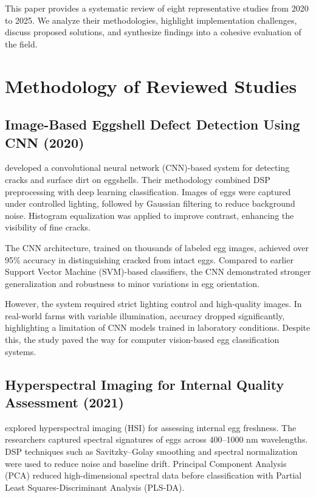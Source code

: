 \documentclass[conference]{IEEEtran}
\begin{document}
	This paper provides a systematic review of eight representative studies from 2020 to 2025. We analyze their methodologies, highlight implementation challenges, discuss proposed solutions, and synthesize findings into a cohesive evaluation of the field.
	
	\section{Methodology of Reviewed Studies}
	
	\subsection{Image-Based Eggshell Defect Detection Using CNN (2020)}
	\cite{zhang2020cnn} developed a convolutional neural network (CNN)-based system for detecting cracks and surface dirt on eggshells. Their methodology combined DSP preprocessing with deep learning classification. Images of eggs were captured under controlled lighting, followed by Gaussian filtering to reduce background noise. Histogram equalization was applied to improve contrast, enhancing the visibility of fine cracks.  
	
	The CNN architecture, trained on thousands of labeled egg images, achieved over 95\% accuracy in distinguishing cracked from intact eggs. Compared to earlier Support Vector Machine (SVM)-based classifiers, the CNN demonstrated stronger generalization and robustness to minor variations in egg orientation.  
	
	However, the system required strict lighting control and high-quality images. In real-world farms with variable illumination, accuracy dropped significantly, highlighting a limitation of CNN models trained in laboratory conditions. Despite this, the study paved the way for computer vision-based egg classification systems.
	
	\subsection{Hyperspectral Imaging for Internal Quality Assessment (2021)}
	\cite{li2021hsi} explored hyperspectral imaging (HSI) for assessing internal egg freshness. The researchers captured spectral signatures of eggs across 400–1000 nm wavelengths. DSP techniques such as Savitzky–Golay smoothing and spectral normalization were used to reduce noise and baseline drift. Principal Component Analysis (PCA) reduced high-dimensional spectral data before classification with Partial Least Squares-Discriminant Analysis (PLS-DA).  
	
\end{document}
